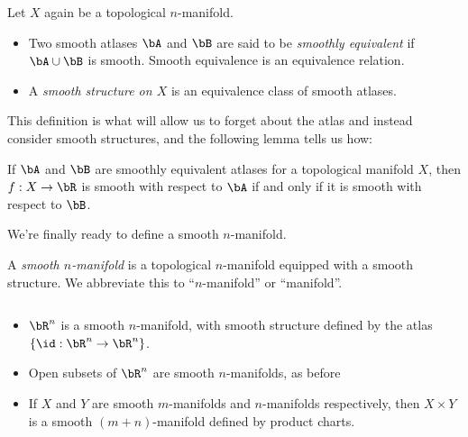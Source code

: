 \begin{defn}\label{defn:smoothly-equiv-altas}
	Let $X$ again be a topological $n$-manifold.
	\begin{itemize}
		\item Two smooth atlases $\bA$ and $\bB$ are said to be \emph{smoothly equivalent} if $\bA\cup \bB$ is smooth. Smooth equivalence is an equivalence relation.
		\item A \emph{smooth structure on $X$} is an equivalence class of smooth atlases.
	\end{itemize}
\end{defn}
This definition is what will allow us to forget about the atlas and instead consider smooth structures, and the following lemma tells us how:
\begin{lem}\label{lem:}
	If $\bA$ and $\bB$ are smoothly equivalent atlases for a topological manifold $X$, then $f:X\to \bR$ is smooth with respect to $\bA$ if and only if it is smooth with respect to $\bB$.
\end{lem}
We're finally ready to define a smooth $n$-manifold.
\begin{defn}\label{defn:}
	A \emph{smooth $n$-manifold} is a topological $n$-manifold equipped with a smooth structure. We abbreviate this to ``$n$-manifold'' or ``manifold''.
\end{defn}
\begin{example}$ $
	\begin{itemize}
		\item $\bR^n$ is a smooth $n$-manifold, with smooth structure defined by the atlas $\{\id:\bR^n\to\bR^n\}$.
		\item Open subsets of $\bR^n$ are smooth $n$-manifolds, as before
		\item If $X$ and $Y$ are smooth $m$-manifolds and $n$-manifolds respectively, then $X\times Y$ is a smooth $(m+n)$-manifold defined by product charts.
	\end{itemize}
\end{example}
